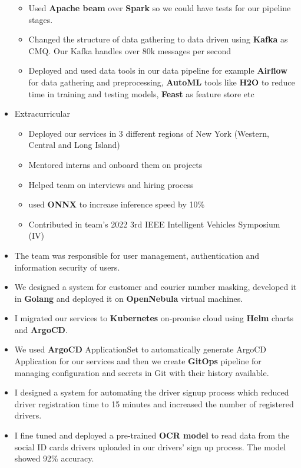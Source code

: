 \begin{itemize}
\begin{itemize}
    \item Used \textbf{Apache beam} over \textbf{Spark} so we could have tests for our pipeline stages.
    \item Changed the structure of data gathering to data driven using \textbf{Kafka} as CMQ. Our Kafka handles over 80k messages per second
    \item Deployed and used data tools in our data pipeline for example \textbf{Airflow} for data gathering and preprocessing, \textbf{AutoML} tools like \textbf{H2O} to reduce time in training and testing models, \textbf{Feast} as feature store etc
  \end{itemize}
  \item Extracurricular
  \begin{itemize}
    \item Deployed our services in 3 different regions of New York (Western, Central and Long Island)
    \item Mentored interns and onboard them on projects
    \item Helped team on interviews and hiring process
    \item used \textbf{ONNX} to increase inference speed by 10\%
    \item Contributed in team's 2022 3rd IEEE Intelligent Vehicles Symposium (IV)
  \end{itemize}
\end{itemize}

\vspace{0.5cm}

\begin{itemize}
  \item The team was responsible for user management, authentication and information security of users.
  \item We designed a system for customer and courier number masking, developed it in \textbf{Golang} and deployed it on \textbf{OpenNebula} virtual machines.
  \item I migrated our services to \textbf{Kubernetes} on‐promise cloud using \textbf{Helm} charts and \textbf{ArgoCD}.
  \item We used \textbf{ArgoCD} ApplicationSet to automatically generate ArgoCD Application for our services and then we create \textbf{GitOps} pipeline for managing configuration and secrets in Git with their history available.
  \item I designed a system for automating the driver signup process which reduced driver registration time to 15 minutes and increased the number of registered drivers.
  \item I fine tuned and deployed a pre-trained \textbf{OCR model} to read data from the social ID cards drivers uploaded in our drivers' sign up process. The model showed 92\% accuracy.
\end{itemize}


